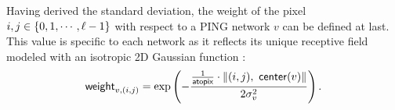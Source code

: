 Having derived the standard deviation, the weight of the pixel $i, j \in \{ 0, 1, \cdots, \ell - 1 \}$ with respect to a PING network $v$ can be defined at last. This value is specific to each network as it reflects its unique receptive field modeled with an isotropic 2D Gaussian function \cite{MaryamPLACEHOLDER}:
\begin{equation}
    \mathsf{weight}_{v, (i, j)} = \exp \left(
        -\frac{ \frac{1}{\mathsf{atopix}} \cdot \| (i, j), \ \mathsf{center}(v) \|}{ 2 \sigma_v^2 }
    \right).
    \label{eq:weight-pixel-network}
\end{equation}